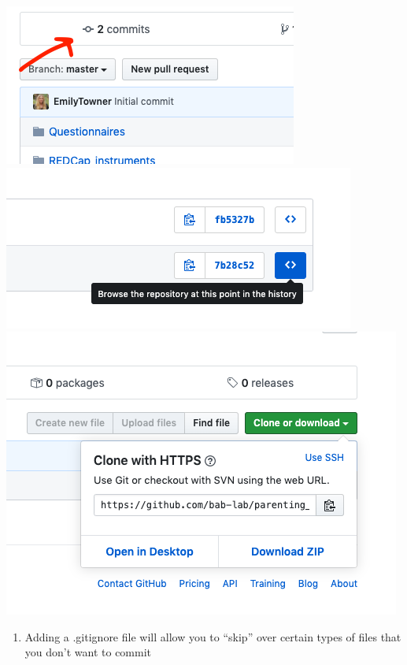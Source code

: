 \documentclass[]{book}
\providecommand{\tightlist}{%
  \setlength{\itemsep}{0pt}\setlength{\parskip}{0pt}}
\begin{document}
\includegraphics{images/research_protocols/github/15.png}
\includegraphics{images/research_protocols/github/16.png}
\includegraphics{images/research_protocols/github/17.png}

\begin{enumerate}
\def\labelenumi{\arabic{enumi}.}
\setcounter{enumi}{10}
\tightlist
\item
  Adding a .gitignore file will allow you to ``skip'' over certain types of files that you don't want to commit
\end{enumerate}
\end{document}
